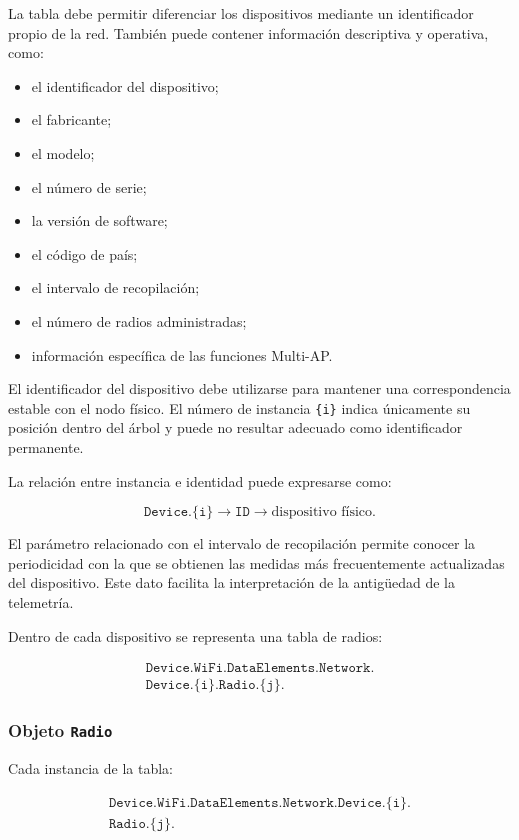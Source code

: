 La tabla debe permitir diferenciar los dispositivos mediante un
identificador propio de la red. También puede contener información
descriptiva y operativa, como:

\begin{itemize}
    \item el identificador del dispositivo;
    \item el fabricante;
    \item el modelo;
    \item el número de serie;
    \item la versión de software;
    \item el código de país;
    \item el intervalo de recopilación;
    \item el número de radios administradas;
    \item información específica de las funciones Multi-AP.
\end{itemize}

El identificador del dispositivo debe utilizarse para mantener una
correspondencia estable con el nodo físico. El número de instancia
\texttt{\{i\}} indica únicamente su posición dentro del árbol y puede no
resultar adecuado como identificador permanente.

La relación entre instancia e identidad puede expresarse como:

\[
    \texttt{Device.\{i\}}
    \longrightarrow
    \texttt{ID}
    \longrightarrow
    \text{dispositivo físico}.
\]

El parámetro relacionado con el intervalo de recopilación permite conocer
la periodicidad con la que se obtienen las medidas más frecuentemente
actualizadas del dispositivo. Este dato facilita la interpretación de la
antigüedad de la telemetría.

Dentro de cada dispositivo se representa una tabla de radios:

\[
\begin{split}
    \texttt{Device.WiFi.DataElements.Network.}\\
    \texttt{Device.\{i\}.Radio.\{j\}.}
\end{split}
\]


\subsubsection*{Objeto \texttt{Radio}}

Cada instancia de la tabla:

\[
\begin{split}
    \texttt{Device.WiFi.DataElements.Network.Device.\{i\}.}\\
    \texttt{Radio.\{j\}.}
\end{split}
\]

